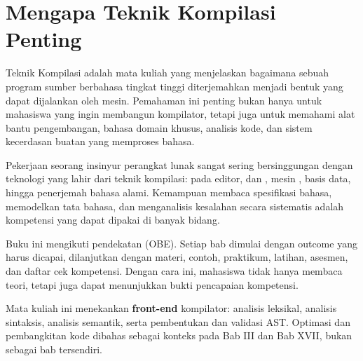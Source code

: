 \section{Mengapa Teknik Kompilasi Penting}
\label{sec:ch01-mengapa}

Teknik Kompilasi adalah mata kuliah yang menjelaskan bagaimana sebuah
program sumber berbahasa tingkat tinggi diterjemahkan menjadi bentuk
yang dapat dijalankan oleh mesin. Pemahaman ini penting bukan hanya
untuk mahasiswa yang ingin membangun kompilator, tetapi juga untuk
memahami alat bantu pengembangan, bahasa domain khusus, analisis kode,
dan sistem kecerdasan buatan yang memproses bahasa.

Pekerjaan seorang insinyur perangkat lunak sangat sering bersinggungan
dengan teknologi yang lahir dari teknik kompilasi:  pada
editor,  dan , mesin ,
 basis data, hingga penerjemah bahasa alami.
Kemampuan membaca spesifikasi bahasa, memodelkan tata bahasa, dan
menganalisis kesalahan secara sistematis adalah kompetensi yang dapat
dipakai di banyak bidang.

Buku ini mengikuti pendekatan  (OBE).
Setiap bab dimulai dengan outcome yang harus dicapai, dilanjutkan
dengan materi, contoh, praktikum, latihan, asesmen, dan daftar cek
kompetensi. Dengan cara ini, mahasiswa tidak hanya membaca teori,
tetapi juga dapat menunjukkan bukti pencapaian kompetensi.

\begin{infobox}
Mata kuliah ini menekankan \textbf{front-end} kompilator: analisis
leksikal, analisis sintaksis, analisis semantik, serta pembentukan dan
validasi AST. Optimasi dan pembangkitan kode dibahas sebagai konteks
pada Bab III dan Bab XVII, bukan sebagai bab tersendiri.
\end{infobox}
